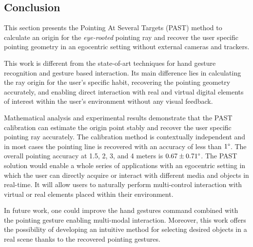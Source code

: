 \subsection{Conclusion}
This section presents the Pointing At Several Targets (PAST) method to calculate an origin for the \textit{eye-rooted} pointing ray and recover the user specific pointing geometry in an egocentric setting without external cameras and trackers. 

This work is different from the state-of-art techniques for hand gesture recognition and gesture based interaction. Its main difference lies in calculating the ray origin for the user's specific habit, recovering the pointing geometry accurately, and enabling direct interaction with real and virtual digital elements of interest within the user's environment without any visual feedback.

Mathematical analysis and experimental results demonstrate that the PAST calibration can estimate the origin point stably and recover the user specific pointing ray accurately. The calibration method is contextually independent and in most cases the pointing line is recovered with an accuracy of less than $1\degree$. The overall pointing accuracy at 1.5, 2, 3, and 4 meters is $0.67\pm0.71\degree$. 
The PAST solution would enable a whole series of applications with an egocentric setting in which the user can directly acquire or interact with different media and objects in real-time. 
It will allow users to naturally perform multi-control interaction with virtual or real elements placed within their environment. 

In future work, one could improve the hand gestures command combined with the pointing gesture enabling multi-modal interaction. Moreover, this work offers the possibility of developing an intuitive method for selecting desired objects in a real scene thanks to the recovered pointing gestures.